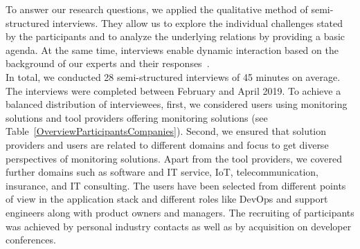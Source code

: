 \documentclass[runningheads]{llncs}
\begin{document}
To answer our research questions, we applied the qualitative method of semi-structured interviews. They allow us to explore the individual challenges stated by the participants and to analyze the underlying relations by providing a basic agenda. At the same time, interviews enable dynamic interaction based on the background of our experts and their responses~\cite{singer2008software}.\\
In total, we conducted 28 semi-structured interviews of 45 minutes on average. The interviews were completed between February and April 2019. To achieve a balanced distribution of interviewees, first, we considered users using monitoring solutions and tool providers offering monitoring solutions (see Table~\ref{OverviewParticipantsCompanies}). Second, we ensured that solution providers and users are related to different domains and focus to get diverse perspectives of monitoring solutions. Apart from the tool providers, we covered further domains such as software and IT service, IoT, telecommunication, insurance, and IT consulting. The users have been selected from different points of view in the application stack and different roles like DevOps and support engineers along with product owners and managers. The recruiting of participants was achieved by personal industry contacts as well as by acquisition on developer conferences.
\end{document}
